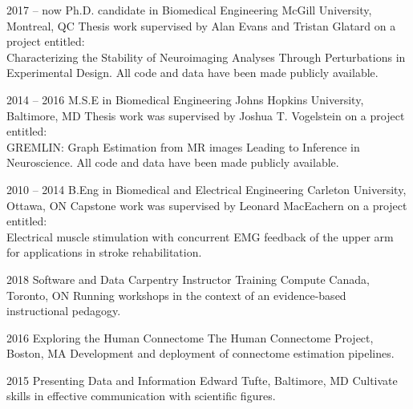 \documentclass[]{friggeri-cv} %
\begin{document}
\begin{entrylist}


\entry
{2017 -- now}
{Ph.D. candidate {\normalfont in Biomedical Engineering}}
{McGill University, Montreal, QC}
{Thesis work supervised by Alan Evans and Tristan Glatard on a project entitled:\\ Characterizing the Stability of
Neuroimaging Analyses Through Perturbations in Experimental Design.
All code and data have been made publicly available.}


\entry
{2014 -- 2016}
{M.S.E {\normalfont in Biomedical Engineering}}
{Johns Hopkins University, Baltimore, MD}
{Thesis work was supervised by Joshua T. Vogelstein on a project entitled:\\GREMLIN:
Graph Estimation from MR images Leading to Inference in Neuroscience. All code and data have
been made publicly available.}


\entry
{2010 -- 2014}
{B.Eng {\normalfont in Biomedical and Electrical Engineering}}
{Carleton University, Ottawa, ON}
{Capstone work was supervised by Leonard MacEachern on a project entitled:\\Electrical
muscle stimulation with concurrent EMG feedback of the upper arm for applications in stroke
rehabilitation.}


\entry
{2018}
{Software and Data Carpentry Instructor Training}
{Compute Canada, Toronto, ON}
{Running workshops in the context of an evidence-based instructional pedagogy.}


\entry
{2016}
{Exploring the Human Connectome}
{The Human Connectome Project, Boston, MA}
{Development and deployment of connectome estimation pipelines.}


\entry
{2015}
{Presenting Data and Information}
{Edward Tufte, Baltimore, MD}
{Cultivate skills in effective communication with scientific figures.}

\end{entrylist}

\end{document}
